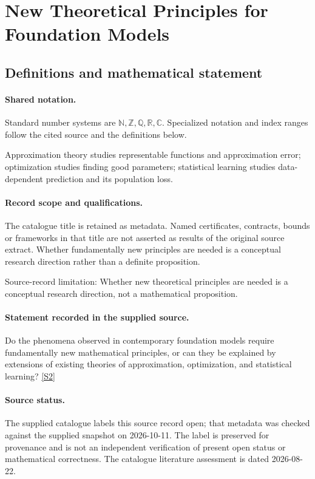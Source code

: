 \documentclass[11pt]{article}
\newcommand{\sref}[2]{\hyperlink{source:#1:#2}{[S#2]}}
\begin{document}
\section{New Theoretical Principles for Foundation Models}\label{statement}

\subsection{Definitions and mathematical statement}

\paragraph{Shared notation.}Standard number systems are $\mathbb N,\mathbb Z,\mathbb Q,\mathbb R,\mathbb C$. Specialized notation and index ranges follow the cited source and the definitions below.


Approximation theory studies representable functions and approximation error; optimization studies finding good parameters; statistical learning studies data-dependent prediction and its population loss.
\paragraph{Record scope and qualifications.}
The catalogue title is retained as metadata. Named certificates, contracts, bounds or frameworks in that title are not asserted as results of the original source extract.
Whether fundamentally new principles are needed is a conceptual research direction rather than a definite proposition.

Source-record limitation: Whether new theoretical principles are needed is a conceptual research direction, not a mathematical proposition.
\paragraph{Statement recorded in the supplied source.}
Do the phenomena observed in contemporary foundation models require fundamentally new mathematical principles, or can they be explained by extensions of existing theories of approximation, optimization, and statistical learning? \sref{statement}{2}
\paragraph{Source status.}
The supplied catalogue labels this source record open; that metadata was checked against the supplied snapshot on 2026-10-11. The label is preserved for provenance and is not an independent verification of present open status or mathematical correctness. The catalogue literature assessment is dated 2026-08-22.
\end{document}
